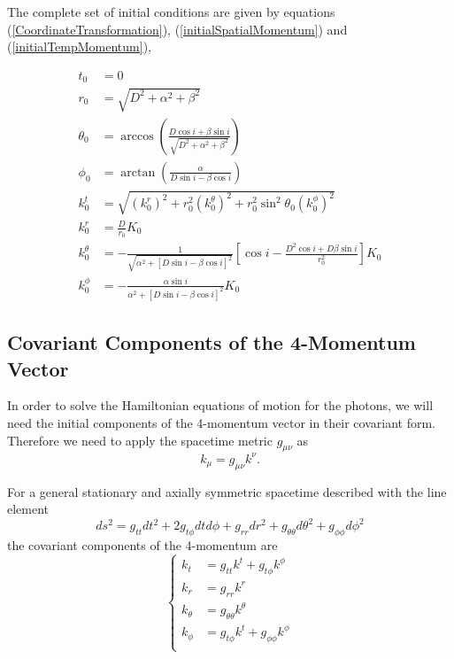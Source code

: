 The complete set of initial conditions are given by equations (\ref{CoordinateTransformation}), (\ref{initialSpatialMomentum}) and (\ref{initialTempMomentum}),

\begin{align}
t_0 &= 0\\
r_0 &= \sqrt{D^2 + \alpha^2 + \beta^2} \\
\theta_0 &= \arccos \left( \frac{D \cos i + \beta \sin i}{\sqrt{D^2 + \alpha^2 + \beta^2}}\right)\\
\phi_0 &= \arctan \left( \frac{\alpha}{D\sin i - \beta \cos i} \right) \\
k^t_0 &= \sqrt{(k^r_0)^2 + r_0^2 (k^\theta _0)^2 + r_0^2 \sin^2 \theta_0 (k^\phi _0)^2}\\
k^r_0 &= \frac{D}{r_0} K_0\\
k^\theta _0 &= -\frac{1}{\sqrt{\alpha^2 +[D\sin i - \beta \cos i]^2}}  \left[ \cos i - \frac{D^2 \cos i + D\beta \sin i}{r^2_0}\right] K_0 \\
k^\phi _0 &= -\frac{\alpha \sin i}{\alpha^2 +[D \sin i - \beta \cos i]^2 } K_0
\end{align}

\subsection{Covariant Components of the 4-Momentum Vector}
In order to solve the Hamiltonian equations of motion for the photons, we will need the initial components of the 4-momentum vector in their covariant form. Therefore we need to apply the spacetime metric $g_{\mu \nu}$ as
\begin{equation}
k_\mu = g_{\mu \nu} k^\nu.
\end{equation}

For a general stationary and axially symmetric spacetime described with the line element
\begin{equation}
ds^2 = g_{tt} dt^2 + 2g_{t \phi} dt d\phi + g_{rr} dr^2 + g_{\theta \theta} d\theta^2 + g_{\phi \phi} d\phi^2
\end{equation}
the covariant components of the 4-momentum are
\begin{equation}
\begin{cases}
k_t &= g_{tt} k^t + g_{t \phi} k^\phi\\
k_r &= g_{rr} k^r \\
k_\theta &= g_{\theta \theta} k^\theta \\
k_\phi &=  g_{t \phi} k^t + g_{\phi \phi} k^\phi\\
\end{cases}
\end{equation}


